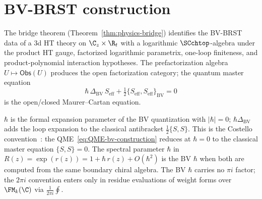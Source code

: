 \section{BV-BRST construction}
\label{sec:BV_construction}
\label{ch:bv-construction}

The bridge theorem (Theorem~\ref{thm:physics-bridge}) identifies the
BV-BRST data of a 3d HT theory on $\C_z \times \R_t$ with a
logarithmic $\SCchtop$-algebra under the product HT gauge,
factorized logarithmic parametrix, one-loop finiteness, and
product-polynomial interaction hypotheses. The prefactorization algebra
$U \mapsto \mathsf{Obs}(U)$ produces the open factorization category;
the quantum master equation
\begin{equation}
\label{eq:QME-bv-construction}
\hbar\,\Delta_{\mathrm{BV}}\, S_{\mathrm{eff}} + \tfrac{1}{2}\{S_{\mathrm{eff}}, S_{\mathrm{eff}}\}_{\mathrm{BV}} = 0
\end{equation}
is the open/closed Maurer--Cartan equation.

\begin{remark}
\label{rem:bv-hbar-convention}
$\hbar$ is the formal expansion parameter of the BV
quantization with $|\hbar|=0$; $\hbar\Delta_{\mathrm{BV}}$ adds the loop
expansion to the classical antibracket $\tfrac12\{S,S\}$. This is the Costello
convention~\cite{CG17}: the QME~\eqref{eq:QME-bv-construction} reduces at
$\hbar=0$ to the classical master equation $\{S,S\}=0$. The spectral parameter $\hbar$ in
$R(z) = \exp(r(z)) = 1 + \hbar\,r(z) + O(\hbar^2)$ is the BV $\hbar$ when both are computed from the same boundary
chiral algebra. The BV $\hbar$ carries no $\pi i$ factor; the $2\pi i$
convention enters only in residue evaluations of weight forms over
$\FM_k(\C)$ via $\frac{1}{2\pi i}\oint$.
\end{remark}

